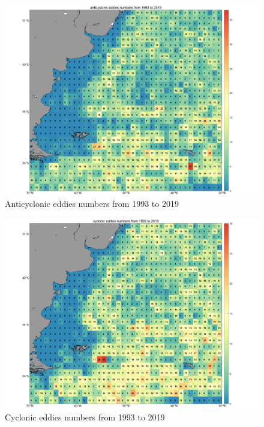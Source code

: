 \begin{figure}[ht]
  \centering
  \setlength{\abovecaptionskip}{0.cm}
  \includegraphics[width=15cm]{chapter/figure/anticyclonic eddies numbers from 1993 to 2019.png}
  \caption
  {Anticyclonic eddies numbers from 1993 to 2019}
  \label{anticyclonic eddies numbers from 1993 to 2019}
\end{figure}

\begin{figure}[ht]
  \centering
  \setlength{\abovecaptionskip}{0.cm}
  \includegraphics[width=15cm]{chapter/figure/cyclonic eddies numbers from 1993 to 2019.png}
  \caption
  {Cyclonic eddies numbers from 1993 to 2019}
  \label{cyclonic eddies numbers from 1993 to 2019}
\end{figure}

